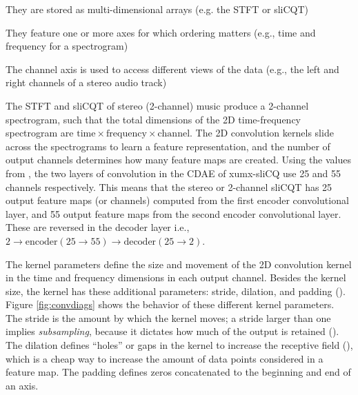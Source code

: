 \documentclass[report.tex]{subfiles}
\begin{document}
\begin{tight_enumerate}
	\item
		They are stored as multi-dimensional arrays (e.g. the STFT or sliCQT)
	\item
		They feature one or more axes for which ordering matters (e.g., time and frequency for a spectrogram)
	\item
		The channel axis is used to access different views of the data (e.g., the left and right channels of a stereo audio track)
\end{tight_enumerate}

The STFT and sliCQT of stereo (2-channel) music produce a 2-channel spectrogram, such that the total dimensions of the 2D time-frequency spectrogram are $\text{time} \times \text{frequency} \times \text{channel}$. The 2D convolution kernels slide across the spectrograms to learn a feature representation, and the number of output channels determines how many feature maps are created. Using the values from \textcite{plumbley2}, the two layers of convolution in the CDAE of xumx-sliCQ use 25 and 55 channels respectively. This means that the stereo or 2-channel sliCQT has 25 output feature maps (or channels) computed from the first encoder convolutional layer, and 55 output feature maps from the second encoder convolutional layer. These are reversed in the decoder layer i.e., $2 \rightarrow \text{encoder}(25 \rightarrow 55) \rightarrow \text{decoder}(25 \rightarrow 2)$.

The kernel parameters define the size and movement of the 2D convolution kernel in the time and frequency dimensions in each output channel. Besides the kernel size, the kernel has these additional parameters: stride, dilation, and padding (\cite{convguide}). Figure \ref{fig:convdiags} shows the behavior of these different kernel parameters. The stride is the amount by which the kernel moves; a stride larger than one implies \textit{subsampling}, because it dictates how much of the output is retained (\cite{convguide}). The dilation defines ``holes'' or gaps in the kernel to increase the receptive field (\cite{convguide}), which is a cheap way to increase the amount of data points considered in a feature map. The padding defines zeros concatenated to the beginning and end of an axis.
\end{document}
